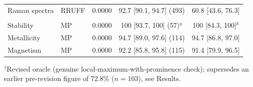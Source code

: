\documentclass[pdflatex,sn-nature]{sn-jnl}
\newcommand{\rev}[1]{#1} %
\newcommand{\rev}[1]{{\color{blue}#1}} %
\providecommand{\DIFdel}[1]{{\protect\color{red} \scriptsize #1}} %
\providecommand{\DIFdelbegin}{} %
\providecommand{\DIFdelend}{} %
\providecommand{\DIFaddendFL}{} %
\providecommand{\DIFscaledelfig}{0.5}
\newlength{\DIFdelgraphicswidth} %
\newlength{\DIFdelgraphicsheight} %
\providecommand{\DIFdelincludegraphics}[2][]{%
\sbox{\DIFdelgraphicsbox}{\DIFOincludegraphics[#1]{#2}}%
\settoboxwidth{\DIFdelgraphicswidth}{\DIFdelgraphicsbox} %
\settoboxtotalheight{\DIFdelgraphicsheight}{\DIFdelgraphicsbox} %
\scalebox{\DIFscaledelfig}{%
\parbox[b]{\DIFdelgraphicswidth}{\usebox{\DIFdelgraphicsbox}\\[-\baselineskip] \rule{\DIFdelgraphicswidth}{0em}}\llap{\resizebox{\DIFdelgraphicswidth}{\DIFdelgraphicsheight}{%
\setlength{\unitlength}{\DIFdelgraphicswidth}%
\begin{picture}(1,1)%
\thicklines\linethickness{2pt} %
{\color[rgb]{1,0,0}\put(0,0){\framebox(1,1){}}}%
{\color[rgb]{1,0,0}\put(0,0){\line( 1,1){1}}}%
{\color[rgb]{1,0,0}\put(0,1){\line(1,-1){1}}}%
\end{picture}%
}\hspace*{3pt}}} %
} %
\DeclareRobustCommand{\DIFdelbegin}{\DIFOdelbegin \let\includegraphics\DIFdelincludegraphics} %
\DeclareRobustCommand{\DIFdelend}{\DIFOaddend \let\includegraphics\DIFOincludegraphics} %
\DeclareRobustCommand{\DIFaddendFL}{\DIFOaddendFL \let\includegraphics\DIFOincludegraphics} %
\begin{document}
\begin{table}[t]
{\begin{tabular}{l l S[table-format=1.4] c c}
Raman spectra & RRUFF & 0.0000 & 92.7 \rev{[90.1, 94.7]} (493) & \rev{60.8 [43.6, 76.3]} \\
\addlinespace
{}\\
Stability & MP & 0.0000 & \rev{100 [93.7, 100] (57)$^{a}$} & \rev{100 [84.3, 100]$^{b}$} \\
Metallicity & MP & 0.0000 & 94.7 \rev{[89.0, 97.6]} (114) & \rev{94.7 [86.8, 97.0]} \\
Magnetism & MP & 0.0000 & 92.2 \rev{[85.8, 95.8]} (115) & \rev{91.4 [79.9, 96.5]} \\
\bottomrule
\end{tabular}\DIFaddendFL }
\end{table}
\DIFdelbegin %
\DIFdel{$^{\dagger}$Revised oracle (genuine local-maximum-with-prominence check);
supersedes an earlier pre-revision figure of 72.8\% ($n=103$), see Results.}%
\DIFdelend 
\end{document}
